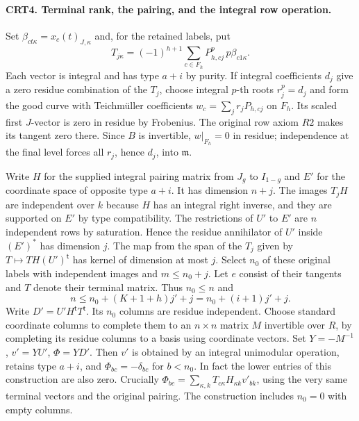\paragraph{CRT4. Terminal rank, the pairing, and the integral row operation.}
Set $\beta_{ct\kappa}=x_c(t)_{J,\kappa}$ and, for the retained labels, put
\[
 T_{j\kappa}=(-1)^{h+1}\sum_{c\in F_h}P_{h,cj}^{p}\,p\beta_{c1\kappa}.
\]
Each vector is integral and has type $a+i$ by purity. If integral
coefficients $d_j$ give a zero residue combination of the $T_j$,
choose integral $p$-th roots $r_j^p=d_j$ and form the good curve
with Teichm\"uller coefficients $w_c=\sum_j r_jP_{h,cj}$ on $F_h$.
Its scaled first $J$-vector is zero in residue by Frobenius.
The original row axiom $R2$ makes its tangent zero there. Since
$B$ is invertible, $w|_{F_h}=0$ in residue; independence at the
final level forces all $r_j$, hence $d_j$, into $\mathfrak m$.

Write $H$ for the supplied integral pairing matrix from $J_g$ to
$I_{1-g}$ and $E'$ for the coordinate space of opposite type $a+i$.
It has dimension $n+j$. The images $T_jH$ are independent over $k$
because $H$ has an integral right inverse, and they are supported on
$E'$ by type compatibility. The restrictions of $U'$ to $E'$ are
$n$ independent rows by saturation. Hence the residue annihilator
of $U'$ inside $(E')^*$ has dimension $j$. The map from the span
of the $T_j$ given by $T\mapsto TH(U')^{\mathsf t}$ has kernel
of dimension at most $j$. Select $n_0$ of these original labels
with independent images and $m\le n_0+j$. Let $e$ consist of their
tangents and $T$ denote their terminal matrix. Thus $n_0\le n$ and
\[
 n\le n_0+(K+1+h)j'+j=n_0+(i+1)j'+j .
\]
Write $D'=U'H^{\mathsf t}T^{\mathsf t}$. Its $n_0$ columns are
residue independent. Choose standard coordinate columns to complete
them to an $n\times n$ matrix $M$ invertible over $R$, by completing
its residue columns to a basis using coordinate vectors. Set
$Y=-M^{-1}$, $v'=YU'$, $\Phi=YD'$. Then $v'$ is obtained by an
integral unimodular operation, retains type $a+i$, and
$\Phi_{bc}=-\delta_{bc}$ for $b<n_0$. In fact the lower entries
of this construction are also zero. Crucially
$\Phi_{bc}=\sum_{\kappa,k}T_{c\kappa}H_{\kappa k}v'_{bk}$,
using the very same terminal vectors and the original pairing.
The construction includes $n_0=0$ with empty columns.

